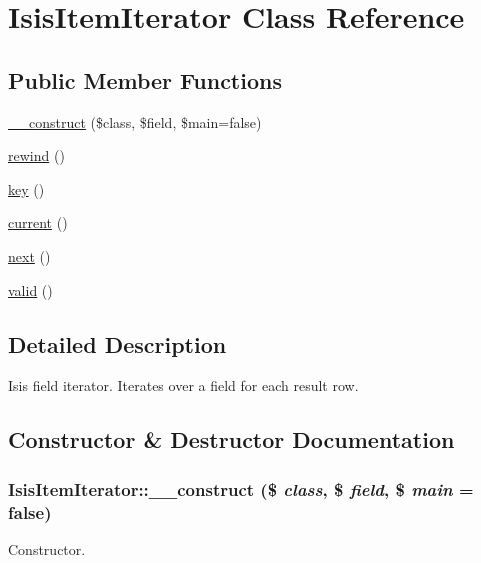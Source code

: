 \hypertarget{classIsisItemIterator}{
\section{IsisItemIterator Class Reference}
\label{classIsisItemIterator}
}
\subsection*{Public Member Functions}
\begin{DoxyCompactItemize}
\item 
\hyperlink{classIsisItemIterator_a6ee7fe126baaffa77ad2cf177fefc46a}{\_\-\_\-construct} (\$class, \$field, \$main=false)
\item 
\hyperlink{classIsisItemIterator_ab87a4387a9fd745366ccf8e138a9f60c}{rewind} ()
\item 
\hyperlink{classIsisItemIterator_ab51757f546b7d9efb9decd701a38b8b5}{key} ()
\item 
\hyperlink{classIsisItemIterator_a3f602399a600d7b95d23b87111d0e72b}{current} ()
\item 
\hyperlink{classIsisItemIterator_a17c6a2e50a0ca67feb92f4ffc4cbec23}{next} ()
\item 
\hyperlink{classIsisItemIterator_aacea6ed6fd269ef1549ce86820da8b3b}{valid} ()
\end{DoxyCompactItemize}


\subsection{Detailed Description}
Isis field iterator. Iterates over a field for each result row. 

\subsection{Constructor \& Destructor Documentation}
\hypertarget{classIsisItemIterator_a6ee7fe126baaffa77ad2cf177fefc46a}{
\subsubsection[{\_\-\_\-construct}]{\setlength{\rightskip}{0pt plus 5cm}IsisItemIterator::\_\-\_\-construct (\$ {\em class}, \/  \$ {\em field}, \/  \$ {\em main} = {\ttfamily false})}}
\label{classIsisItemIterator_a6ee7fe126baaffa77ad2cf177fefc46a}
Constructor.


